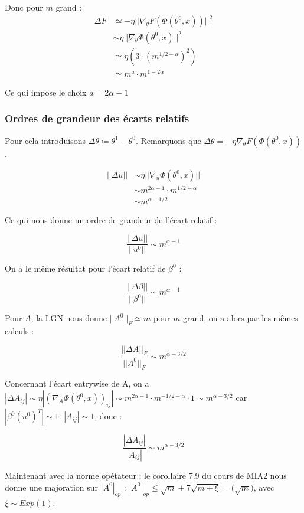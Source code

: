 \documentclass[a4paper, 11pt, french]{article}
\theoremstyle{definition}
\begin{document}
	 Donc pour $m$ grand :
	 \begin{align*}
	 	\Delta F &\simeq -\eta || \nabla_{\theta} F(\Phi(\theta^0, x)) ||^2 \\
	 	&\sim \eta || \nabla_{\theta} \Phi(\theta^0, x) ||^2 \\
	 	&\simeq \eta (3 \cdot (m^{1/2 - \alpha})^2) \\
	 	&\simeq m^a \cdot m^{1 - 2\alpha}
	 \end{align*}	
	
	Ce qui impose le choix $a = 2\alpha - 1$ \\
	
	\subsubsection{Ordres de grandeur des écarts relatifs}

	Pour cela introduisons $\Delta \theta \coloneqq \theta^1 - \theta^0$. Remarquons que $	\Delta \theta = - \eta \nabla_{\theta} F(\Phi(\theta^0, x))$.
	
	\begin{align}
		||\Delta u|| &\sim \eta || \nabla_u \Phi(\theta^0, x) || \\
		&\sim m^{2\alpha - 1} \cdot m^{1/2 - \alpha} \\
		&\sim m^{\alpha - 1/2}
	\end{align}

	Ce qui nous donne un ordre de grandeur de l'écart relatif :
	
	\[\frac{||\Delta u||}{||u^0||} \sim m^{\alpha - 1}\]
	
	On a le même résultat pour l'écart relatif de $\beta^0$ :
	
	\[\frac{||\Delta \beta||}{||\beta^0||} \sim m^{\alpha - 1}\]
	
	Pour $A$, la LGN nous donne $||A^0||_F \simeq m$ pour $m$ grand, on a alors par les mêmes calculs :
	
	\[\frac{||\Delta A||_F}{||A^0||_F} \sim m^{\alpha - 3/2}\]
	
	Concernant l'écart entrywise de A, on a $|\Delta A_{ij}| \sim \eta | (\nabla_A \Phi(\theta^0, x))_{ij} | \sim m^{2\alpha - 1} \cdot m^{-1/2 - \alpha} \cdot 1 \sim m^{\alpha - 3/2}$ car $|\beta^0 (u^0)^T| \sim 1$. $|A_{ij}| \sim 1$, donc :

	\[\frac{|\Delta A_{ij}|}{|A_{ij}|} \sim m^{\alpha - 3/2}\]
	
	Maintenant avec la norme opétateur : le corollaire 7.9 du cours de MIA2 nous donne une majoration sur $|A^0|_{op}$ : $|A^0|_{op} \leq \sqrt{m} + 7\sqrt{m + \xi} = \mathcal( \sqrt{m})$, avec $\xi \sim Exp(1)$.
	
\end{document}
